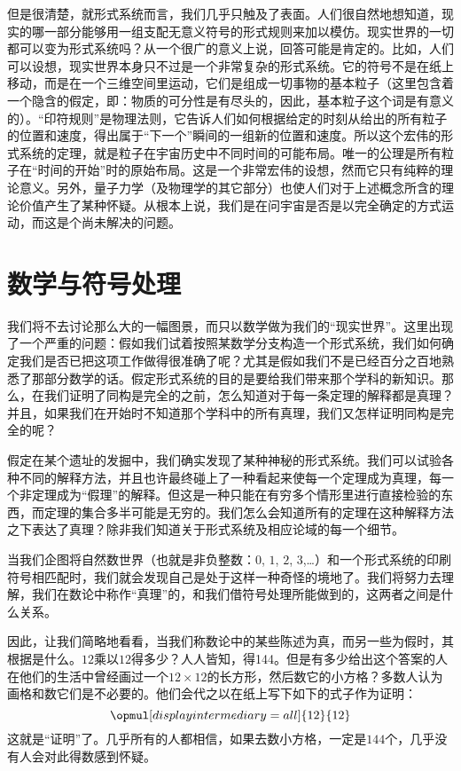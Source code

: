 但是很清楚，就形式系统而言，我们几乎只触及了表面。人们很自然地想知道，现实的哪一部分能够用一组支配无意义符号的形式规则来加以模仿。现实世界的一切都可以变为形式系统吗？从一个很广的意义上说，回答可能是肯定的。比如，人们可以设想，现实世界本身只不过是一个非常复杂的形式系统。它的符号不是在纸上移动，而是在一个三维空间里运动，它们是组成一切事物的基本粒子（这里包含着一个隐含的假定，即：物质的可分性是有尽头的，因此，基本粒子这个词是有意义的）。“印符规则”是物理法则，它告诉人们如何根据给定的时刻从给出的所有粒子的位置和速度，得出属于“下一个”瞬间的一组新的位置和速度。所以这个宏伟的形式系统的定理，就是粒子在宇宙历史中不同时间的可能布局。唯一的公理是所有粒子在“时间的开始”时的原始布局。这是一个非常宏伟的设想，然而它只有纯粹的理论意义。另外，量子力学（及物理学的其它部分）也使人们对于上述概念所含的理论价值产生了某种怀疑。从根本上说，我们是在问宇宙是否是以完全确定的方式运动，而这是个尚未解决的问题。

\section{数学与符号处理}

我们将不去讨论那么大的一幅图景，而只以数学做为我们的“现实世界”。这里出现了一个严重的问题：假如我们试着按照某数学分支构造一个形式系统，我们如何确定我们是否已把这项工作做得很准确了呢？尤其是假如我们不是已经百分之百地熟悉了那部分数学的话。假定形式系统的目的是要给我们带来那个学科的新知识。那么，在我们证明了同构是完全的之前，怎么知道对于每一条定理的解释都是真理？并且，如果我们在开始时不知道那个学科中的所有真理，我们又怎样证明同构是完全的呢？

假定在某个遗址的发掘中，我们确实发现了某种神秘的形式系统。我们可以试验各种不同的解释方法，并且也许最终碰上了一种看起来使每一个定理成为真理，每一个非定理成为“假理”的解释。但这是一种只能在有穷多个情形里进行直接检验的东西，而定理的集合多半可能是无穷的。我们怎么会知道所有的定理在这种解释方法之下表达了真理？除非我们知道关于形式系统及相应论域的每一个细节。

当我们企图将自然数世界（也就是非负整数：$0$, $1$, $2$, $3$,\ldots）和一个形式系统的印刷符号相匹配时，我们就会发现自己是处于这样一种奇怪的境地了。我们将努力去理解，我们在数论中称作“真理”的，和我们借符号处理所能做到的，这两者之间是什么关系。

因此，让我们简略地看看，当我们称数论中的某些陈述为真，而另一些为假时，其根据是什么。$12$乘以$12$得多少？人人皆知，得144。但是有多少给出这个答案的人在他们的生活中曾经画过一个$12\times 12$的长方形，然后数它的小方格？多数人认为画格和数它们是不必要的。他们会代之以在纸上写下如下的式子作为证明：
\[
  \opmul[displayintermediary=all]{12}{12}
\]
这就是“证明”了。几乎所有的人都相信，如果去数小方格，一定是$144$个，几乎没有人会对此得数感到怀疑。

